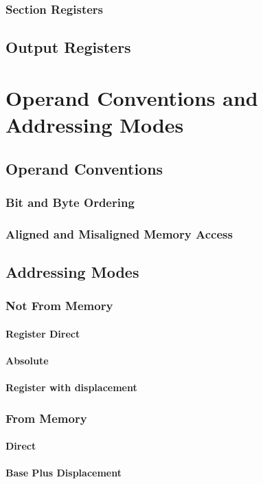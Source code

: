 \documentclass[oneside, a4paper]{memoir}
\begin{document}
\subsection{Section Registers}
\section{Output Registers}

\chapter{Operand Conventions and Addressing Modes}
\section{Operand Conventions}
\label{sec:Operand Conventions}
\subsection{Bit and Byte Ordering}
\subsection{Aligned and Misaligned Memory Access}
\section{Addressing Modes}
\subsection{Not From Memory}
\subsubsection{Register Direct}
\subsubsection{Absolute}
\subsubsection{Register with displacement}
\subsection{From Memory}
\subsubsection{Direct}
\subsubsection{Base Plus Displacement}
\end{document}
